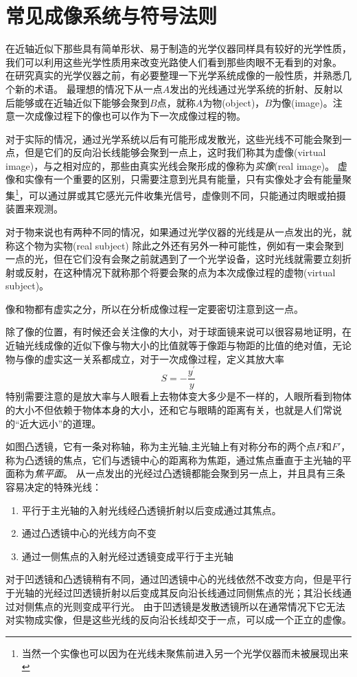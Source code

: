 \section{常见成像系统与符号法则}

在近轴近似下那些具有简单形状、易于制造的光学仪器同样具有较好的光学性质，我们可以利用这些光学性质用来改变光路使人们看到那些肉眼不无看到的对象。
在研究真实的光学仪器之前，有必要整理一下光学系统成像的一般性质，并熟悉几个新的术语。
最理想的情况下从一点$A$发出的光线通过光学系统的折射、反射以后能够或在近轴近似下能够会聚到$B$点，就称$A$为{\heiti 物}(object)，$B$为{\heiti 像}(image)。注意一次成像过程下的像也可以作为下一次成像过程的物。

对于实际的情况，通过光学系统以后有可能形成发散光，这些光线不可能会聚到一点，但是它们的反向沿长线能够会聚到一点上，这时我们称其为{\heiti 虚像}(virtual image)，与之相对应的，那些由真实光线会聚形成的像称为\emph{实像}(real image)。
虚像和实像有一个重要的区别，只需要注意到光具有能量，只有实像处才会有能量聚集\footnote{当然一个实像也可以因为在光线未聚焦前进入另一个光学仪器而未被展现出来}，可以通过屏或其它感光元件收集光信号，虚像则不同，只能通过肉眼或拍摄装置来观测。

对于物来说也有两种不同的情况，如果通过光学仪器的光线是从一点发出的光，就称这个物为{\heiti 实物}(real subject)
除此之外还有另外一种可能性，例如有一束会聚到一点的光，但在它们没有会聚之前就遇到了一个光学设备，这时光线就需要立刻折射或反射，在这种情况下就称那个将要会聚的点为本次成像过程的{\heiti 虚物}(virtual subject)。

像和物都有虚实之分，所以在分析成像过程一定要密切注意到这一点。

除了像的位置，有时候还会关注像的大小，对于球面镜来说可以很容易地证明，在近轴光线成像的近似下像与物大小的比值就等于像距与物距的比值的绝对值，无论物与像的虚实这一关系都成立，对于一次成像过程，定义其放大率
\begin{equation}
S = -\frac{y^\prime}{y}
\end{equation}
特别需要注意的是放大率与人眼看上去物体变大多少是不一样的，人眼所看到物体的大小不但依赖于物体本身的大小，还和它与眼睛的距离有关，也就是人们常说的“近大远小”的道理。

如图凸透镜，它有一条对称轴，称为{\heiti 主光轴},主光轴上有对称分布的两个点$F$和$F'$，称为凸透镜的{\heiti 焦点}，它们与透镜中心的距离称为{\heiti 焦距}，通过焦点垂直于主光轴的平面称为\emph{焦平面}。
从一点发出的光经过凸透镜都能会聚到另一点上，并且具有三条容易决定的特殊光线：
\begin{enumerate}
\item 平行于主光轴的入射光线经凸透镜折射以后变成通过其焦点。
\item 通过凸透镜中心的光线方向不变
\item 通过一侧焦点的入射光经过透镜变成平行于主光轴
\end{enumerate}
对于凹透镜和凸透镜稍有不同，通过凹透镜中心的光线依然不改变方向，但是平行于光轴的光经过凹透镜折射以后变成其反向沿长线通过同侧焦点的光；其沿长线通过对侧焦点的光则变成平行光。
由于凹透镜是发散透镜所以在通常情况下它无法对实物成实像，但是这些光线的反向沿长线却交于一点，可以成一个正立的虚像。






